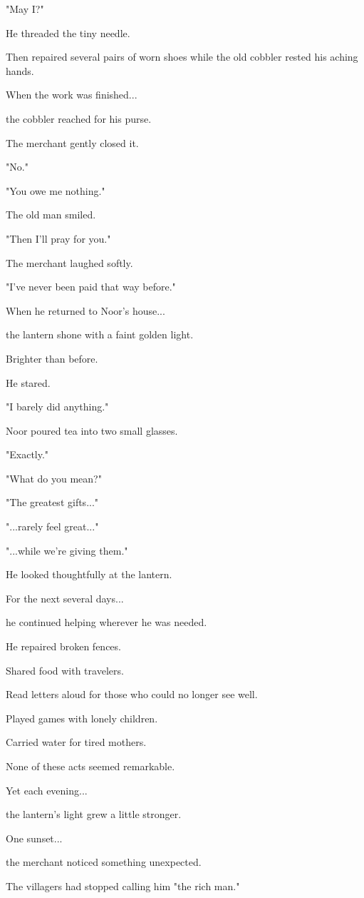 \documentclass[12pt,openany]{book}
\begin{document}
"May I?"

He threaded the tiny needle.

Then repaired several pairs of worn shoes while the old cobbler rested his aching hands.

When the work was finished...

the cobbler reached for his purse.

The merchant gently closed it.

"No."

"You owe me nothing."

The old man smiled.

"Then I'll pray for you."

The merchant laughed softly.

"I've never been paid that way before."

When he returned to Noor's house...

the lantern shone with a faint golden light.

Brighter than before.

He stared.

"I barely did anything."

Noor poured tea into two small glasses.

"Exactly."

"What do you mean?"

"The greatest gifts..."

"...rarely feel great..."

"...while we're giving them."

He looked thoughtfully at the lantern.

For the next several days...

he continued helping wherever he was needed.

He repaired broken fences.

Shared food with travelers.

Read letters aloud for those who could no longer see well.

Played games with lonely children.

Carried water for tired mothers.

None of these acts seemed remarkable.

Yet each evening...

the lantern's light grew a little stronger.

One sunset...

the merchant noticed something unexpected.

The villagers had stopped calling him "the rich man."
\end{document}
